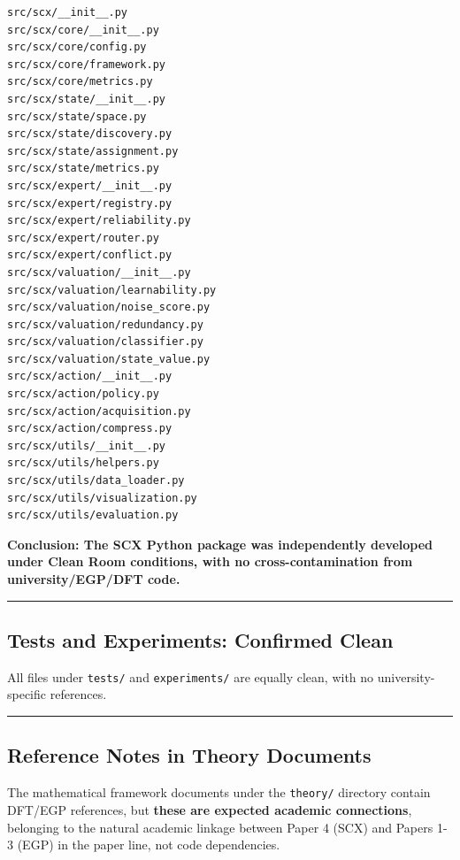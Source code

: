 \documentclass[
  12pt,
]{article}
\begin{document}
\begin{verbatim}
src/scx/__init__.py
src/scx/core/__init__.py
src/scx/core/config.py
src/scx/core/framework.py
src/scx/core/metrics.py
src/scx/state/__init__.py
src/scx/state/space.py
src/scx/state/discovery.py
src/scx/state/assignment.py
src/scx/state/metrics.py
src/scx/expert/__init__.py
src/scx/expert/registry.py
src/scx/expert/reliability.py
src/scx/expert/router.py
src/scx/expert/conflict.py
src/scx/valuation/__init__.py
src/scx/valuation/learnability.py
src/scx/valuation/noise_score.py
src/scx/valuation/redundancy.py
src/scx/valuation/classifier.py
src/scx/valuation/state_value.py
src/scx/action/__init__.py
src/scx/action/policy.py
src/scx/action/acquisition.py
src/scx/action/compress.py
src/scx/utils/__init__.py
src/scx/utils/helpers.py
src/scx/utils/data_loader.py
src/scx/utils/visualization.py
src/scx/utils/evaluation.py
\end{verbatim}

\textbf{Conclusion: The SCX Python package was independently developed under Clean Room conditions, with no cross-contamination from university/EGP/DFT code.}

\begin{center}\rule{0.5\linewidth}{0.5pt}\end{center}

\subsection{Tests and Experiments: Confirmed Clean}\label{tests-and-experiments-confirmed-clean}

All files under \texttt{tests/} and \texttt{experiments/} are equally clean, with no university-specific references.

\begin{center}\rule{0.5\linewidth}{0.5pt}\end{center}

\subsection{Reference Notes in Theory Documents}\label{reference-notes-in-theory-documents}

The mathematical framework documents under the \texttt{theory/} directory contain DFT/EGP
references, but \textbf{these are expected academic connections}, belonging to the natural academic linkage between Paper 4 (SCX) and Papers 1-3 (EGP) in the paper line, not code dependencies.
\end{document}
